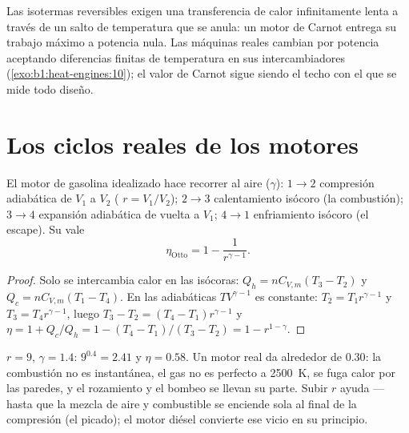 \begin{remark}\label{rem:b1:heat-engines:notengine}
Las isotermas reversibles exigen una transferencia de calor infinitamente
lenta a través de un salto de temperatura que se anula: un motor de Carnot
entrega su trabajo máximo a potencia nula. Las máquinas reales cambian
 por potencia aceptando diferencias finitas de temperatura en
sus intercambiadores (\cref{exo:b1:heat-engines:10}); el valor de Carnot
sigue siendo el techo con el que se mide todo diseño.
\end{remark}

\section{Los ciclos reales de los motores}

\begin{proposition}\label{prop:b1:heat-engines:otto}
El motor de gasolina idealizado hace recorrer al aire ($\gamma$): $1 \to 2$
compresión adiabática de $V_1$ a $V_2$ (\emph{}
$r = V_1/V_2$); $2 \to 3$ calentamiento isócoro (la combustión); $3 \to 4$
expansión adiabática de vuelta a $V_1$; $4 \to 1$ enfriamiento isócoro (el
escape). Su  vale
\[
\eta_{\text{Otto}} = 1 - \frac{1}{r^{\gamma-1}} .
\]
\end{proposition}

\begin{proof}
Solo se intercambia calor en las isócoras: $Q_h = nC_{V,m}(T_3 - T_2)$ y
$Q_c = nC_{V,m}(T_1 - T_4)$. En las adiabáticas $TV^{\gamma-1}$ es constante:
$T_2 = T_1r^{\gamma-1}$ y $T_3 = T_4r^{\gamma-1}$, luego $T_3 - T_2 =
(T_4 - T_1)r^{\gamma-1}$ y
$\eta = 1 + Q_c/Q_h = 1 - (T_4 - T_1)/(T_3 - T_2) = 1 - r^{1-\gamma}$.
\end{proof}

\begin{example}\label{ex:b1:heat-engines:ottonumbers}
$r = 9$, $\gamma = 1.4$: $9^{0.4} = 2.41$ y $\eta = 0.58$. Un motor real da
alrededor de $0.30$: la combustión no es instantánea, el gas no es perfecto
a \qty{2500}{K}, se fuga calor por las paredes, y el rozamiento y el
bombeo se llevan su parte. Subir $r$ ayuda --- hasta que la mezcla de aire
y combustible se enciende sola al final de la compresión (el picado); el
motor diésel convierte ese vicio en su principio.
\end{example}

